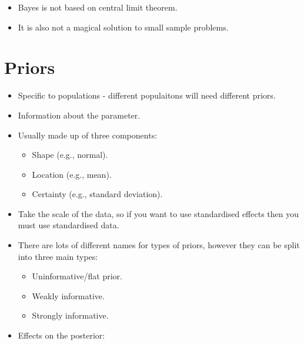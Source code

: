 \documentclass[
]{book}
\providecommand{\tightlist}{%
  \setlength{\itemsep}{0pt}\setlength{\parskip}{0pt}}
\begin{document}
\begin{itemize}
\begin{itemize}
    \begin{itemize}
    \tightlist
    \item
      Bayes is not based on central limit theorem.
    \item
      It is also not a magical solution to small sample problems.
    \end{itemize}
  \end{itemize}
\end{itemize}

\section{Priors}\label{priors}

\begin{itemize}
\tightlist
\item
  Specific to populations - different populaitons will need different priors.
\item
  Information about the parameter.
\item
  Usually made up of three components:

  \begin{itemize}
  \tightlist
  \item
    Shape (e.g., normal).
  \item
    Location (e.g., mean).
  \item
    Certainty (e.g., standard deviation).
  \end{itemize}
\item
  Take the scale of the data, so if you want to use standardised effects then you must use standardised data.
\item
  There are lots of different names for types of priors, however they can be split into three main types:

  \begin{itemize}
  \tightlist
  \item
    Uninformative/flat prior.
  \item
    Weakly informative.
  \item
    Strongly informative.
  \end{itemize}
\item
  Effects on the posterior:


\end{itemize}
\end{document}
